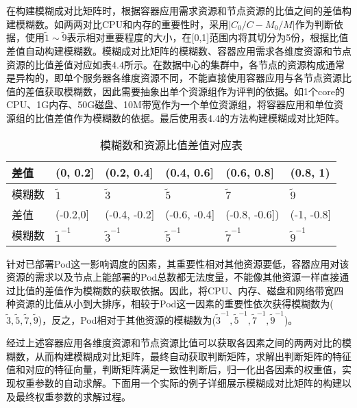 在构建模糊成对比矩阵时，根据容器应用需求资源和节点资源的比值之间的差值构建模糊数。如两两对比CPU和内存的重要性时，采用$|C_{0}/C-M_{0}/M|$作为判断依据，使用$\widetilde{1}\sim\widetilde{9}$表示相对重要程度的大小，在[0,1]范围内将其切分为5份，根据比值差值自动构建模糊数。模糊成对比矩阵的模糊数、容器应用需求各维度资源和节点资源的比值差值对应如表4.4所示。在数据中心的集群中，各节点的资源构成通常是异构的，即单个服务器各维度资源不同，不能直接使用容器应用与各节点资源比值的差值获取模糊数，因此需要抽象出单个资源组作为评判的依据。如1个core的CPU、1G内存、50G磁盘、10M带宽作为一个单位资源组，将容器应用和单位资源组的比值差值作为模糊数的依据。最后使用表4.4的方法构建模糊成对比矩阵。
\begin{table}[htbp]
	\centering\dawu[1.3]
	\caption{模糊数和资源比值差值对应表}
	\begin{tabular}{|p{1.8cm}<{\centering}|p{1.8cm}<{\centering}|p{1.8cm}<{\centering}|p{1.8cm}<{\centering}|p{1.8cm}<{\centering}|p{1.8cm}<{\centering}|} \hline
		差值 & (0, 0.2] & (0.2, 0.4] & (0.4, 0.6] & (0.6, 0.8] & (0.8, 1) \\ \hline
		模糊数 & $\widetilde{1}$ & $\widetilde{3}$ & $\widetilde{5}$ & $\widetilde{7}$  & $\widetilde{9}$  \\ \hline
		差值 & (-0.2,0] & (-0.4, -0.2] & (-0.6, -0.4] & (-0.8, -0.6]) & (-1, -0.8]  \\ \hline
		模糊数 & $\widetilde{1}^{-1}$ & $\widetilde{3}^{-1}$ & $\widetilde{5}^{-1}$ & $\widetilde{7}^{-1}$ & $\widetilde{9}^{-1}$  \\ \hline
	\end{tabular}
\end{table}

针对已部署Pod这一影响调度的因素，其重要性相对其他资源要低，容器应用对该资源的需求以及节点上能部署的Pod总数都无法度量，不能像其他资源一样直接通过比值的差值作为模糊数的获取依据。因此，将CPU、内存、磁盘和网络带宽四种资源的比值从小到大排序，相较于Pod这一因素的重要性依次获得模糊数为(${\widetilde{3},\widetilde{5},\widetilde{7},\widetilde{9}}$)，反之，Pod相对于其他资源的模糊数为(${\widetilde{3}^{-1},\widetilde{5}^{-1},\widetilde{7}^{-1},\widetilde{9}^{-1}}$)。

经过上述容器应用各维度资源和节点资源比值可以获取各因素之间的两两对比的模糊数，从而构建模糊成对比矩阵，最终自动获取判断矩阵，求解出判断矩阵的特征值和对应的特征向量，判断矩阵满足一致性判断后，归一化出各因素的权重值，实现权重参数的自动求解。下面用一个实际的例子详细展示模糊成对比矩阵的构建以及最终权重参数的求解过程。

